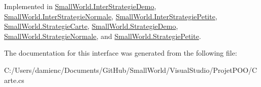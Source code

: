 Implemented in \hyperlink{interface_small_world_1_1_inter_strategie_demo_a58c028866f521ee3e50ea0d7e94268e7}{Small\-World.\-Inter\-Strategie\-Demo}, \hyperlink{interface_small_world_1_1_inter_strategie_normale_a6488d973a40d587a3357b6e690104258}{Small\-World.\-Inter\-Strategie\-Normale}, \hyperlink{interface_small_world_1_1_inter_strategie_petite_a41c2fe281215427dbdf531fae8dae05f}{Small\-World.\-Inter\-Strategie\-Petite}, \hyperlink{class_small_world_1_1_strategie_carte_a451fff74bf423f6e225fd4816a7d1868}{Small\-World.\-Strategie\-Carte}, \hyperlink{class_small_world_1_1_strategie_demo_a6a9bbb801d3f894d735dc21d9029c2ee}{Small\-World.\-Strategie\-Demo}, \hyperlink{class_small_world_1_1_strategie_normale_a7f3732b81d0b4b1e11dae277d6db219c}{Small\-World.\-Strategie\-Normale}, and \hyperlink{class_small_world_1_1_strategie_petite_a9ecc5edc2c1d26f7ff8839bea646c698}{Small\-World.\-Strategie\-Petite}.



The documentation for this interface was generated from the following file\-:\begin{DoxyCompactItemize}
\item 
C\-:/\-Users/damienc/\-Documents/\-Git\-Hub/\-Small\-World/\-Visual\-Studio/\-Projet\-P\-O\-O/Carte.\-cs\end{DoxyCompactItemize}
